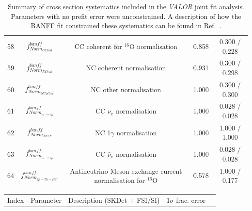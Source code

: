 {\begin{table}
\begin{tabular}{| c | c | c | c | c |}
58      &  $f_{Norm_{CCcoh}}^{banff}$                                & CC coherent for $^{16}$O normalisation                      & 0.858   & 0.300 / 0.228 \\   
59      &  $f_{Norm_{NCcoh}}^{banff}$                                & NC coherent normalisation                                   & 0.931   & 0.300 / 0.298 \\   
60      &  $f_{Norm_{NCother}}^{banff}$                              & NC other normalisation                                      & 1.000   & 0.300 / 0.300 \\   
61      &  $f_{Norm_{\nu_e \rightarrow \nu_\mu}}^{banff}$            & CC $\nu_{e}$ normalisation                                  & 1.000   & 0.028 / 0.028 \\   
62      &  $f_{Norm_{NC1\gamma}}^{banff}$                            & NC 1$\gamma$ normalisation                                  & 1.000   & 1.000 / 1.000 \\   
63      &  $f_{Norm_{\bar{\nu}_e \rightarrow \bar{\nu}_\mu}}^{banff}$  & CC $\bar{\nu}_{e}$ normalisation                            & 1.000   & 0.028 / 0.028 \\   
64      &  $f_{Norm_{2p-2h-Bar}}^{banff}$                            & Antineutrino Meson exchange current normalisation for $^{16}$O& 0.578   & 1.000 / 0.177 \\ 

\hline

\end{tabular}

\caption{
Summary of cross section systematics included in the {\em VALOR} joint fit analysis. Parameters with no prefit error were unconstrained.
A description of how the BANFF fit constrained these systematics can be found in Ref.~\cite{BANFF2015}.
}
\label{tab:banff_uncertainties_xsec}

\end{table}




\begin{table}

\begin{tabular}{| c | c | c | c | c |}
\hline
 Index & Parameter                                & Description  (SKDet + FSI/SI)                                                               & 1$\sigma$ frac. error \\
        

\end{tabular}
\end{table}}
